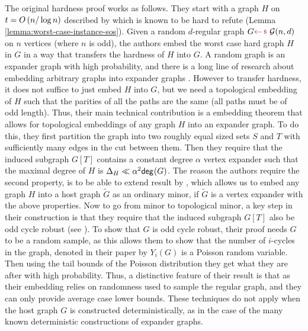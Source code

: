 \documentclass[11pt]{article}
\begin{document}
The original hardness proof works as follows.
They start with a graph $H$ on $t = O\left(n/\log n\right)$ described by \citet{buss1999linear} which is known to be hard to refute (Lemma \ref{lemma:worst-case-instance-sos}).
Given a random $d$-regular graph $G\samples \mathcal{G}(n, d)$ on $n$ vertices (where $n$ is odd), the authors embed the worst case hard graph $H$ in $G$ in a way that transfers the hardness of $H$ into $G$.
A random graph is an expander graph with high probability, and there is a long line of research about embedding arbitrary graphs into expander graphs \citep{krivelevich2019completeminorsgraphssparse, kleinberg1996short}.
However to transfer hardness, it does not suffice to just embed $H$ into $G$, but we need a topological embedding of $H$ such that the parities of all the paths are the same (all paths must be of odd length).
Thus, their main technical contribution is a embedding theorem that allows for  topological embeddings of any graph $H$ into an expander graph.
To do this, they first partition the graph into two roughly equal sized sets $S$ and $T$ with sufficiently many edges in the cut between them.
Then they require that the induced subgraph $G[T]$ contains a constant degree $\alpha$ vertex expander such that the maximal degree of $H$ is $\Delta_{H} \ll \alpha^2 \mathsf{deg}_{}(G)$.
The reason the authors require the second property, is to be able to extend result by \citet{krivelevich2019completeminorsgraphssparse}, which allows us to embed any graph $H$ into a host graph $\tilde{G}$ as an ordinary minor, if $\tilde{G}$ is a vertex expander with the above properties.
Now to go from minor to topological minor, a key step in their construction is that they require that the induced subgraph $G[T]$ also be odd cycle robust (see \citep[Definition 3.2]{Austrin_2022}).
To show that $G$ is odd cycle robust, their proof needs $G$ to be a random sample, as this allows them to show that the number of $i$-cycles in the graph, denoted in their paper by $Y_i(G)$ is a Poisson random variable.
Then using the tail bounds of the Poisson distribution they get what they are after with high probability.
Thus, a distinctive feature of their result is that as their embedding relies on randomness used to sample the regular graph, and they can only provide average case lower bounds.
These techniques do not apply when the host graph $G$ is constructed deterministically, as in the case of the many known deterministic constructions of expander graphs.\par
\end{document}
